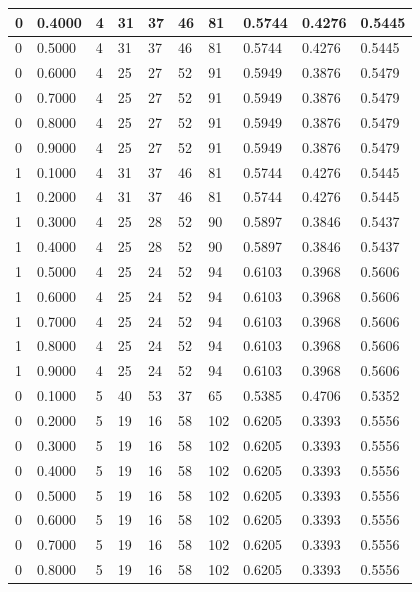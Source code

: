 \documentclass[12pt]{article}
\begin{document}
\begin{table}
{\begin{tabular}{| l | l | l | l | l | l | l | l | l | l |}
			0 & 0.4000 & 4 & 31 & 37 & 46 & 81 & 0.5744 & 0.4276 & 0.5445\\ \hline
			0 & 0.5000 & 4 & 31 & 37 & 46 & 81 & 0.5744 & 0.4276 & 0.5445\\ \hline
			0 & 0.6000 & 4 & 25 & 27 & 52 & 91 & 0.5949 & 0.3876 & 0.5479\\ \hline
			0 & 0.7000 & 4 & 25 & 27 & 52 & 91 & 0.5949 & 0.3876 & 0.5479\\ \hline
			0 & 0.8000 & 4 & 25 & 27 & 52 & 91 & 0.5949 & 0.3876 & 0.5479\\ \hline
			0 & 0.9000 & 4 & 25 & 27 & 52 & 91 & 0.5949 & 0.3876 & 0.5479\\ \hline
			1 & 0.1000 & 4 & 31 & 37 & 46 & 81 & 0.5744 & 0.4276 & 0.5445\\ \hline
			1 & 0.2000 & 4 & 31 & 37 & 46 & 81 & 0.5744 & 0.4276 & 0.5445\\ \hline
			1 & 0.3000 & 4 & 25 & 28 & 52 & 90 & 0.5897 & 0.3846 & 0.5437\\ \hline
			1 & 0.4000 & 4 & 25 & 28 & 52 & 90 & 0.5897 & 0.3846 & 0.5437\\ \hline
			1 & 0.5000 & 4 & 25 & 24 & 52 & 94 & 0.6103 & 0.3968 & 0.5606\\ \hline
			1 & 0.6000 & 4 & 25 & 24 & 52 & 94 & 0.6103 & 0.3968 & 0.5606\\ \hline
			1 & 0.7000 & 4 & 25 & 24 & 52 & 94 & 0.6103 & 0.3968 & 0.5606\\ \hline
			1 & 0.8000 & 4 & 25 & 24 & 52 & 94 & 0.6103 & 0.3968 & 0.5606\\ \hline
			1 & 0.9000 & 4 & 25 & 24 & 52 & 94 & 0.6103 & 0.3968 & 0.5606\\ \hline
			0 & 0.1000 & 5 & 40 & 53 & 37 & 65 & 0.5385 & 0.4706 & 0.5352\\ \hline
			0 & 0.2000 & 5 & 19 & 16 & 58 & 102 & 0.6205 & 0.3393 & 0.5556\\ \hline
			0 & 0.3000 & 5 & 19 & 16 & 58 & 102 & 0.6205 & 0.3393 & 0.5556\\ \hline
			0 & 0.4000 & 5 & 19 & 16 & 58 & 102 & 0.6205 & 0.3393 & 0.5556\\ \hline
			0 & 0.5000 & 5 & 19 & 16 & 58 & 102 & 0.6205 & 0.3393 & 0.5556\\ \hline
			0 & 0.6000 & 5 & 19 & 16 & 58 & 102 & 0.6205 & 0.3393 & 0.5556\\ \hline
			0 & 0.7000 & 5 & 19 & 16 & 58 & 102 & 0.6205 & 0.3393 & 0.5556\\ \hline
			0 & 0.8000 & 5 & 19 & 16 & 58 & 102 & 0.6205 & 0.3393 & 0.5556\\ \hline

\end{tabular}}
\end{table}
\end{document}
